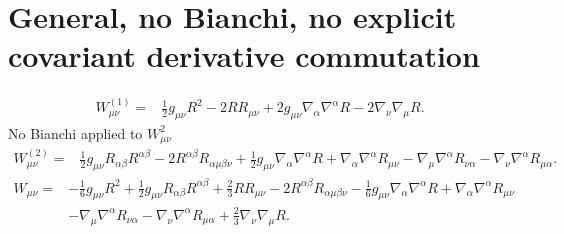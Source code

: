 \documentclass[10pt,letterpaper]{article}
\begin{document}
\section*{General, no Bianchi, no explicit covariant derivative commutation}
\begin{align}
W^{(1)}_{\mu\nu}={}&\tfrac{1}{2} g_{\mu \nu} R^2
 - 2 R R_{\mu \nu}
 + 2 g_{\mu \nu} \nabla_{\alpha}\nabla^{\alpha}R
 - 2 \nabla_{\nu}\nabla_{\mu}R.
\end{align}
No Bianchi applied to $W^2_{\mu\nu}$
\begin{align}
W^{(2)}_{\mu\nu}={}&\tfrac{1}{2} g_{\mu \nu} R_{\alpha \beta} R^{\alpha \beta}
 - 2 R^{\alpha \beta} R_{\alpha \mu \beta \nu}
 + \tfrac{1}{2} g_{\mu \nu} \nabla_{\alpha}\nabla^{\alpha}R
 + \nabla_{\alpha}\nabla^{\alpha}R_{\mu \nu}
 -  \nabla_{\mu}\nabla^{\alpha}R_{\nu \alpha}
 -  \nabla_{\nu}\nabla^{\alpha}R_{\mu \alpha}.
\end{align}
\begin{align}
W_{\mu\nu}={}&- \tfrac{1}{6} g_{\mu \nu} R^2
 + \tfrac{1}{2} g_{\mu \nu} R_{\alpha \beta} R^{\alpha \beta}
 + \tfrac{2}{3} R R_{\mu \nu}
 - 2 R^{\alpha \beta} R_{\alpha \mu \beta \nu}
 -  \tfrac{1}{6} g_{\mu \nu} \nabla_{\alpha}\nabla^{\alpha}R
 + \nabla_{\alpha}\nabla^{\alpha}R_{\mu \nu}\nonumber\\
& -  \nabla_{\mu}\nabla^{\alpha}R_{\nu \alpha}
 -  \nabla_{\nu}\nabla^{\alpha}R_{\mu \alpha}
 + \tfrac{2}{3} \nabla_{\nu}\nabla_{\mu}R.
\end{align}
\end{document}
